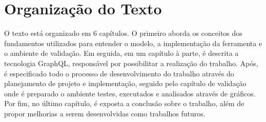 \section[Organização do Texto]{Organização do Texto}

O texto está organizado em 6 capítulos. O primeiro aborda os conceitos dos fundamentos utilizados para entender o modelo, a implementação da ferramenta e o ambiente de validação. Em seguida, em um capítulo à parte, é descrita a tecnologia GraphQL, responsável por possibilitar a realização do trabalho. Após, é especificado todo o processo de desenvolvimento do trabalho através do planejamento de projeto e implementação, seguido pelo capítulo de validação onde é preparado o ambiente testes, executados e analisados através de gráficos. Por fim, no último capítulo, é exposta a conclusão sobre o trabalho, além de propor melhorias a serem desenvolvidas como trabalhos futuros.
